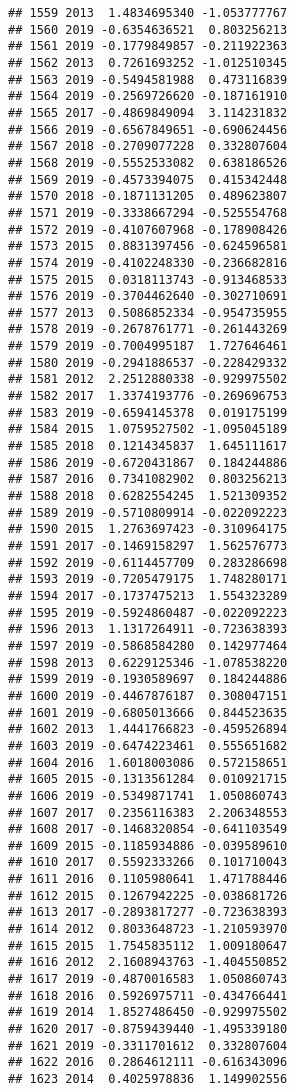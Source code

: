 \documentclass[
]{article}
\begin{document}
\begin{verbatim}
## 1559 2013  1.4834695340 -1.053777767
## 1560 2019 -0.6354636521  0.803256213
## 1561 2019 -0.1779849857 -0.211922363
## 1562 2013  0.7261693252 -1.012510345
## 1563 2019 -0.5494581988  0.473116839
## 1564 2019 -0.2569726620 -0.187161910
## 1565 2017 -0.4869849094  3.114231832
## 1566 2019 -0.6567849651 -0.690624456
## 1567 2018 -0.2709077228  0.332807604
## 1568 2019 -0.5552533082  0.638186526
## 1569 2019 -0.4573394075  0.415342448
## 1570 2018 -0.1871131205  0.489623807
## 1571 2019 -0.3338667294 -0.525554768
## 1572 2019 -0.4107607968 -0.178908426
## 1573 2015  0.8831397456 -0.624596581
## 1574 2019 -0.4102248330 -0.236682816
## 1575 2015  0.0318113743 -0.913468533
## 1576 2019 -0.3704462640 -0.302710691
## 1577 2013  0.5086852334 -0.954735955
## 1578 2019 -0.2678761771 -0.261443269
## 1579 2019 -0.7004995187  1.727646461
## 1580 2019 -0.2941886537 -0.228429332
## 1581 2012  2.2512880338 -0.929975502
## 1582 2017  1.3374193776 -0.269696753
## 1583 2019 -0.6594145378  0.019175199
## 1584 2015  1.0759527502 -1.095045189
## 1585 2018  0.1214345837  1.645111617
## 1586 2019 -0.6720431867  0.184244886
## 1587 2016  0.7341082902  0.803256213
## 1588 2018  0.6282554245  1.521309352
## 1589 2019 -0.5710809914 -0.022092223
## 1590 2015  1.2763697423 -0.310964175
## 1591 2017 -0.1469158297  1.562576773
## 1592 2019 -0.6114457709  0.283286698
## 1593 2019 -0.7205479175  1.748280171
## 1594 2017 -0.1737475213  1.554323289
## 1595 2019 -0.5924860487 -0.022092223
## 1596 2013  1.1317264911 -0.723638393
## 1597 2019 -0.5868584280  0.142977464
## 1598 2013  0.6229125346 -1.078538220
## 1599 2019 -0.1930589697  0.184244886
## 1600 2019 -0.4467876187  0.308047151
## 1601 2019 -0.6805013666  0.844523635
## 1602 2013  1.4441766823 -0.459526894
## 1603 2019 -0.6474223461  0.555651682
## 1604 2016  1.6018003086  0.572158651
## 1605 2015 -0.1313561284  0.010921715
## 1606 2019 -0.5349871741  1.050860743
## 1607 2017  0.2356116383  2.206348553
## 1608 2017 -0.1468320854 -0.641103549
## 1609 2015 -0.1185934886 -0.039589610
## 1610 2017  0.5592333266  0.101710043
## 1611 2016  0.1105980641  1.471788446
## 1612 2015  0.1267942225 -0.038681726
## 1613 2017 -0.2893817277 -0.723638393
## 1614 2012  0.8033648723 -1.210593970
## 1615 2015  1.7545835112  1.009180647
## 1616 2012  2.1608943763 -1.404550852
## 1617 2019 -0.4870016583  1.050860743
## 1618 2016  0.5926975711 -0.434766441
## 1619 2014  1.8527486450 -0.929975502
## 1620 2017 -0.8759439440 -1.495339180
## 1621 2019 -0.3311701612  0.332807604
## 1622 2016  0.2864612111 -0.616343096
## 1623 2014  0.4025978836  1.149902556

\end{verbatim}
\end{document}
